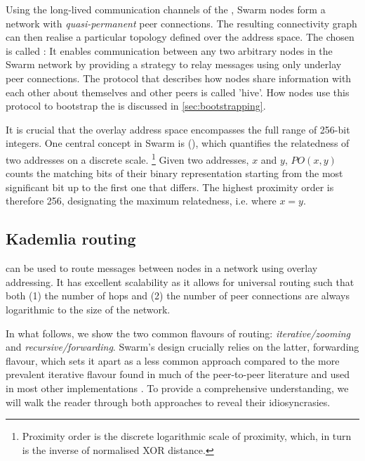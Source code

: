 Using the long-lived communication channels of the , Swarm nodes form a network with \emph{quasi-permanent} peer connections. The resulting connectivity graph can then realise a particular topology defined over the address space. The  chosen is called : It enables communication between any two arbitrary nodes in the Swarm network by providing a strategy to relay messages using only underlay peer connections. The protocol that describes how nodes share information with each other about themselves and other peers is called 'hive'. How nodes use this protocol to bootstrap the  is discussed in \ref{sec:bootstrapping}. 

It is crucial that the overlay address space encompasses the full range of 256-bit integers. One central concept in Swarm is  (), which quantifies the relatedness of two addresses on a discrete scale.%
%
\footnote{Proximity order is the discrete logarithmic scale of proximity, which, in turn is the inverse of normalised XOR distance.%
}
%
Given two addresses, $x$ and $y$, $\mathit{PO}(x,y)$ counts the matching bits of their binary representation starting from the most significant bit up to the first one that differs. The highest proximity order is therefore 256, designating the maximum relatedness, i.e. where $x=y$.

\subsection{Kademlia routing \statusgreen}\label{sec:kademlia-routing}

 can be used to route messages between nodes in a network using overlay addressing. It has excellent scalability as it allows for universal routing such that both (1) the number of hops and (2) the number of peer connections are always logarithmic to the size of the network. 

In what follows, we show the two common flavours of routing: \emph{iterative/zooming} and \emph{recursive/forwarding}. Swarm's design crucially relies on the latter, forwarding flavour, which sets it apart as a less common approach compared to the more prevalent iterative flavour found in much of the peer-to-peer literature and used in most other implementations \citep[see][]{maymounkov2002kademlia,baumgart2007s,lua2005survey}. To provide a comprehensive understanding, we will walk the reader through both approaches to reveal their idiosyncrasies.

